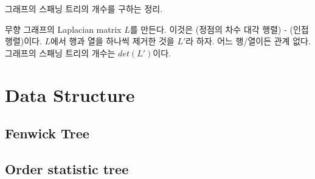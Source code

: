 \documentclass[10pt,landscape,a4paper,twocolumn]{article}
\begin{document}
그래프의 스패닝 트리의 개수를 구하는 정리.

무향 그래프의 Laplacian matrix $L$를 만든다. 이것은 (정점의 차수 대각 행렬) - (인접행렬)이다.
$L$에서 행과 열을 하나씩 제거한 것을 $L'$라 하자. 어느 행/열이든 관계 없다.
그래프의 스패닝 트리의 개수는 $det(L')$이다.


\section{Data Structure}

\subsection{Fenwick Tree}


\subsection{Order statistic tree}

\end{document}
